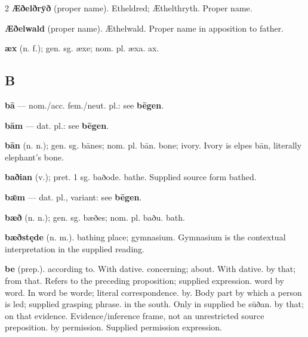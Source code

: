 \begin{multicols*}{2}
\textbf{Æðelðrȳð} (proper name). Etheldred; Æthelthryth. Proper name.\par
\textbf{Æðelwald} (proper name). Æthelwald. Proper name in apposition to father.\par
\textbf{æx} (n. f.); gen. sg. æxe; nom. pl. æxa. ax.\par
\subsection*{B}
\textbf{bā} — nom./acc. fem./neut. pl.: see \textbf{bēgen}.\par
\textbf{bām} — dat. pl.: see \textbf{bēgen}.\par
\textbf{bān} (n. n.); gen. sg. bānes; nom. pl. bān. bone; ivory. Ivory is elpes bān, literally elephant's bone.\par
\textbf{baðian} (v.); pret. 1 sg. baðode. bathe. Supplied source form bathed.\par
\textbf{bǣm} — dat. pl., variant: see \textbf{bēgen}.\par
\textbf{bæð} (n. n.); gen. sg. bæðes; nom. pl. baðu. bath.\par
\textbf{bæðstęde} (n. m.). bathing place; gymnasium. Gymnasium is the contextual interpretation in the supplied reading.\par
\textbf{be} (prep.). according to. With dative. concerning; about. With dative. by that; from that. Refers to the preceding proposition; supplied expression. word by word. In word be worde; literal correspondence. by. Body part by which a person is led; supplied grasping phrase. in the south. Only in supplied be sūðan. by that; on that evidence. Evidence/inference frame, not an unrestricted source preposition. by permission. Supplied permission expression.\par

\end{multicols*}
